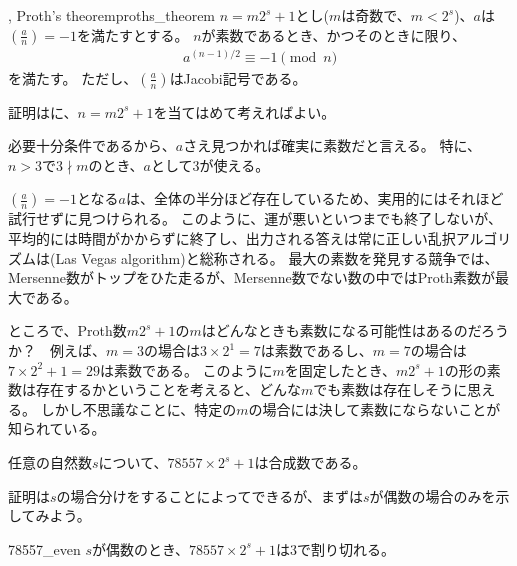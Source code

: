 \begin{Theo}{, Proth's theorem}{proths_theorem}
$n=m2^s+1$とし($m$は奇数で、$m<2^s$)、$a$は$\left(\frac{a}{n}\right)=-1$を満たすとする。
$n$が素数であるとき、かつそのときに限り、
\begin{align*}
a^{(n-1)/2} \equiv -1 \pmod{n}
\end{align*}
を満たす。
ただし、$\left(\frac{a}{n}\right)$はJacobi記号である。
\end{Theo}

証明はに、$n=m2^s+1$を当てはめて考えればよい。


必要十分条件であるから、$a$さえ見つかれば確実に素数だと言える。
特に、$n>3$で$3 \nmid m$のとき、$a$として3が使える。


$\left(\frac{a}{n}\right)=-1$となる$a$は、全体の半分ほど存在しているため、実用的にはそれほど試行せずに見つけられる。
このように、運が悪いといつまでも終了しないが、平均的には時間がかからずに終了し、出力される答えは常に正しい乱択アルゴリズムは(Las Vegas algorithm)と総称される。
最大の素数を発見する競争では、Mersenne数がトップをひた走るが、Mersenne数でない数の中ではProth素数が最大である。

ところで、Proth数$m2^s+1$の$m$はどんなときも素数になる可能性はあるのだろうか？　例えば、$m=3$の場合は$3\times2^1=7$は素数であるし、$m=7$の場合は$7\times2^2+1=29$は素数である。
このように$m$を固定したとき、$m2^s+1$の形の素数は存在するかということを考えると、どんな$m$でも素数は存在しそうに思える。
しかし不思議なことに、特定の$m$の場合には決して素数にならないことが知られている。

\begin{Theo}{}{}
任意の自然数$s$について、$78557\times 2^s+1$は合成数である。
\end{Theo}

証明は$s$の場合分けをすることによってできるが、まずは$s$が偶数の場合のみを示してみよう。

\begin{Prop}{}{78557_even}
$s$が偶数のとき、$78557\times 2^s+1$は$3$で割り切れる。
\end{Prop}

